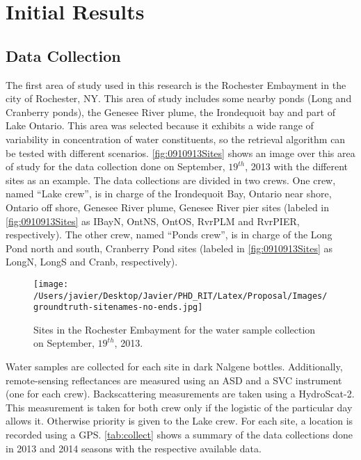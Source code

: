 \chapter{Initial Results}
\section{Data Collection}

The first area of study used in this research is the Rochester Embayment in the city of Rochester, NY. This area of study includes some nearby ponds (Long and Cranberry ponds), the Genesee River plume, the Irondequoit bay and part of Lake Ontario. This area was selected because it exhibits a wide range of variability in concentration of water constituents, so the retrieval algorithm can be tested with different scenarios. \autoref{fig:0910913Sites} shows an image over this area of study for the data collection done on September, $19^{th}$, 2013  with the different sites as an example. The data collections are divided in two crews. One crew, named ``Lake crew'', is in charge of the Irondequoit Bay, Ontario near shore, Ontario off shore, Genesee River plume, Genesee River pier sites (labeled in \autoref{fig:0910913Sites} as IBayN, OntNS, OntOS, RvrPLM and RvrPIER, respectively). The other crew, named ``Ponds crew'', is in charge of the Long Pond north and south, Cranberry Pond sites (labeled in \autoref{fig:0910913Sites} as LongN, LongS and Cranb, respectively).

\begin{figure}[htb]
  \centering
  \texttt{[image: /Users/javier/Desktop/Javier/PHD\_RIT/Latex/Proposal/Images/groundtruth-sitenames-no-ends.jpg]}
  \caption{Sites in the Rochester Embayment for the water sample collection on September, $19^{th}$, 2013.\label{fig:0910913Sites} } 
\end{figure}

Water samples are collected for each site in dark Nalgene bottles. Additionally, remote-sensing reflectances are measured using an ASD and a SVC instrument (one for each crew). Backscattering measurements are taken using a HydroScat-2. This measurement is taken for both crew only if the logistic of the particular day allows it. Otherwise priority is given to the Lake crew. For each site, a location is recorded using a GPS. \autoref{tab:collect} shows a summary of the data collections done in 2013 and 2014 seasons with the respective available data.

